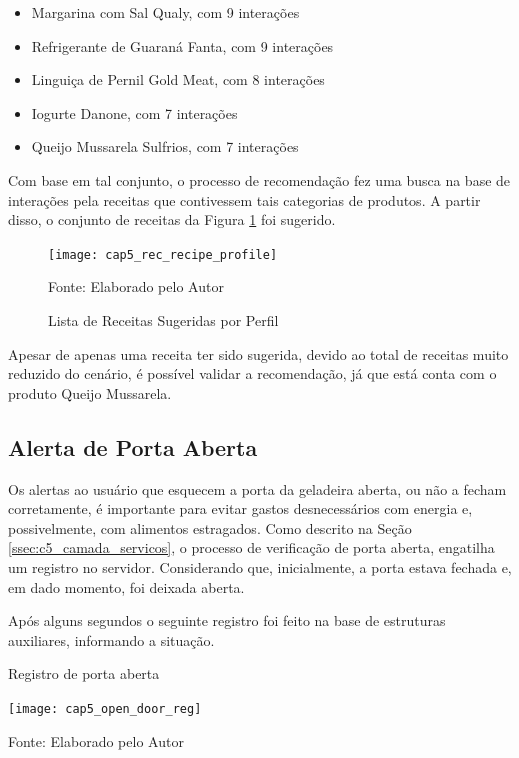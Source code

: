 \begin{itemize} \parskip -3pt
    \item Margarina com Sal Qualy, com 9 interações
    \item Refrigerante de Guaraná Fanta, com 9 interações
    \item Linguiça de Pernil Gold Meat, com 8 interações
    \item Iogurte Danone, com 7 interações
    \item Queijo Mussarela Sulfrios, com 7 interações
\end{itemize}

Com base em tal conjunto, o processo de recomendação fez uma busca na base de interações pela receitas que contivessem tais categorias de produtos. A partir disso, o conjunto de receitas da Figura \ref{fig:cap5_rec_recipe_profile} foi sugerido.



\begin{figure}[htb]
    \caption{Lista de Receitas Sugeridas por Perfil}  
    \label{fig:cap5_rec_recipe_profile}
    \texttt{[image: cap5\_rec\_recipe\_profile]}
   
    \footnotesize{Fonte: Elaborado pelo Autor}
\end{figure}

Apesar de apenas uma receita ter sido sugerida, devido ao total de receitas muito reduzido do cenário, é possível validar a recomendação, já que está conta com o produto Queijo Mussarela.

\subsection{Alerta de Porta Aberta}

Os alertas ao usuário que esquecem a porta da geladeira aberta, ou não a fecham corretamente, é importante para evitar gastos desnecessários com energia e, possivelmente, com alimentos estragados. Como descrito na Seção \ref{ssec:c5_camada_servicos}, o processo de verificação de porta aberta, engatilha um registro no servidor. Considerando que, inicialmente, a porta estava fechada e, em dado momento, foi deixada aberta.

Após alguns segundos o seguinte registro foi feito na base de estruturas auxiliares, informando a situação.


\begin{quadro}[H]
    \caption{Registro de porta aberta}
    \label{fig:cap5_open_door_reg}
    \texttt{[image: cap5\_open\_door\_reg]}
    
    \footnotesize{Fonte: Elaborado pelo Autor}
\end{quadro}

